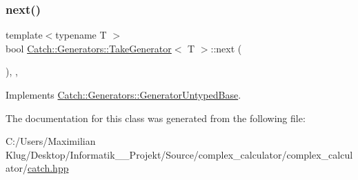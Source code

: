 \mbox{\label{class_catch_1_1_generators_1_1_take_generator_ae343f3e28fe04e0a20d6fdf69bfb4c78}} 
\subsubsection{\texorpdfstring{next()}{next()}}
{\footnotesize\ttfamily template$<$typename T $>$ \\
bool \mbox{\hyperlink{class_catch_1_1_generators_1_1_take_generator}{Catch\+::\+Generators\+::\+Take\+Generator}}$<$ T $>$\+::next (\begin{DoxyParamCaption}{ }\end{DoxyParamCaption})\hspace{0.3cm}{\ttfamily [inline]}, {\ttfamily [override]}, {\ttfamily [virtual]}}



Implements \mbox{\hyperlink{class_catch_1_1_generators_1_1_generator_untyped_base_aeed3c0cd6233c5f553549e453b8d6638}{Catch\+::\+Generators\+::\+Generator\+Untyped\+Base}}.



The documentation for this class was generated from the following file\+:\begin{DoxyCompactItemize}
\item 
C\+:/\+Users/\+Maximilian Klug/\+Desktop/\+Informatik\+\_\+\_\+\+Projekt/\+Source/complex\+\_\+calculator/complex\+\_\+calculator/\mbox{\hyperlink{catch_8hpp}{catch.\+hpp}}\end{DoxyCompactItemize}
